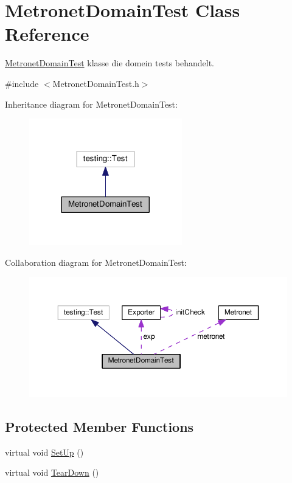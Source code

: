 \hypertarget{class_metronet_domain_test}{}\section{Metronet\+Domain\+Test Class Reference}
\label{class_metronet_domain_test}


\hyperlink{class_metronet_domain_test}{Metronet\+Domain\+Test} klasse die domein tests behandelt.  




{\ttfamily \#include $<$Metronet\+Domain\+Test.\+h$>$}



Inheritance diagram for Metronet\+Domain\+Test\+:\nopagebreak
\begin{figure}[H]
\begin{center}
\leavevmode
\includegraphics[width=188pt]{class_metronet_domain_test__inherit__graph}
\end{center}
\end{figure}


Collaboration diagram for Metronet\+Domain\+Test\+:
\nopagebreak
\begin{figure}[H]
\begin{center}
\leavevmode
\includegraphics[width=350pt]{class_metronet_domain_test__coll__graph}
\end{center}
\end{figure}
\subsection*{Protected Member Functions}
\begin{DoxyCompactItemize}
\item 
virtual void \hyperlink{class_metronet_domain_test_ac8e8d15b45d53810c4427084fad6388f}{Set\+Up} ()
\item 
virtual void \hyperlink{class_metronet_domain_test_a3429b373771815652c80d013f81369a0}{Tear\+Down} ()
\end{DoxyCompactItemize}
